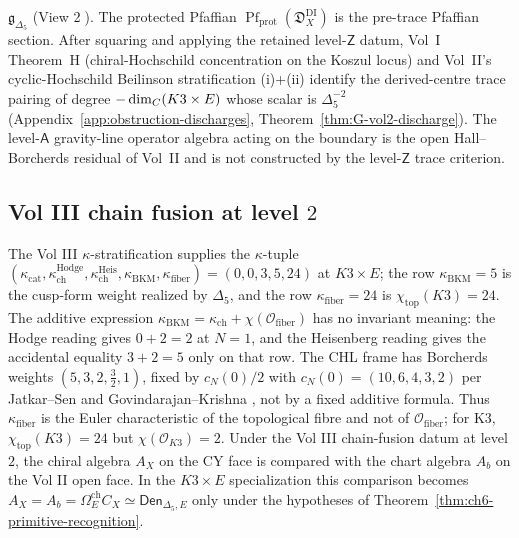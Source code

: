 \(\mathfrak g_{\Delta_5}\) (View \textcircled{\scriptsize 2}).  The
protected Pfaffian \(\operatorname{Pf}_{\mathrm{prot}}(\mathfrak D_X^{\mathrm{DI}})\)
is the pre-trace Pfaffian section.  After squaring and applying the
retained level-\(\mathsf Z\) datum, Vol~I Theorem~H
(chiral-Hochschild concentration on the Koszul locus) and Vol~II's
cyclic-Hochschild Beilinson stratification \textnormal{(i)+(ii)}
identify the derived-centre trace pairing of degree
\(-\dim_{C}(K3\times E)\) whose scalar is \(\Delta_5^{-2}\)
(Appendix~\ref{app:obstruction-discharges},
Theorem~\ref{thm:G-vol2-discharge}).  The level-\(\mathsf A\)
gravity-line operator algebra acting on the boundary is the open
Hall--Borcherds residual of Vol~II and is not constructed by the
level-\(\mathsf Z\) trace criterion.

\subsection{Vol III chain fusion at level \(2\)}
\label{subsec:ch6-vol3-chain-fusion}

The Vol III \(\kappa\)-stratification supplies the
\(\kappa\)-tuple
\((\kappa_{\mathrm{cat}},\kappa_{\mathrm{ch}}^{\mathrm{Hodge}},
\kappa_{\mathrm{ch}}^{\mathrm{Heis}},\kappa_{\mathrm{BKM}},
\kappa_{\mathrm{fiber}})=(0,0,3,5,24)\) at \(K3\times E\); the row
\(\kappa_{\mathrm{BKM}}=5\) is the cusp-form weight realized by
\(\Delta_5\), and the row \(\kappa_{\mathrm{fiber}}=24\) is
\(\chi_{\mathrm{top}}(K3)=24\).  The additive expression
\(\kappa_{\mathrm{BKM}}=\kappa_{\mathrm{ch}}+\chi(\mathcal O_{\mathrm{fiber}})\)
has no invariant meaning: the Hodge reading gives \(0+2=2\) at \(N=1\),
and the Heisenberg reading gives the accidental equality \(3+2=5\) only
on that row.  The CHL frame has Borcherds weights
\((5,3,2,\tfrac32,1)\), fixed by \(c_N(0)/2\) with
\(c_N(0)=(10,6,4,3,2)\) per Jatkar--Sen and Govindarajan--Krishna
\cite{JS06Dyon,GK09CHL,GK10Composite},
not by a fixed additive
formula.  Thus \(\kappa_{\mathrm{fiber}}\) is the Euler characteristic
of the topological fibre and not of \(\mathcal O_{\mathrm{fiber}}\); for
K3, \(\chi_{\mathrm{top}}(K3)=24\) but
\(\chi(\mathcal O_{K3})=2\).  Under
the Vol III chain-fusion datum at level \(2\), the chiral algebra
\(A_X\) on the CY face is compared with the chart algebra
\(A_b\) on the Vol II open face.  In the \(K3\times E\) specialization
this comparison becomes
\(A_X=A_b=\Omega_E^{\mathrm{ch}}C_X\simeq\mathsf{Den}_{\Delta_5,E}\) only
under the hypotheses of Theorem~\ref{thm:ch6-primitive-recognition}.

